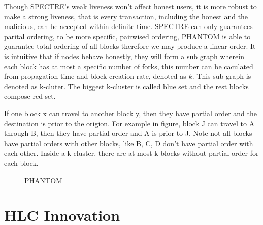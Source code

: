 \documentclass[a4paper,11pt]{article}
\begin{document}
Though SPECTRE's weak liveness won't affect honest users, it is more robust to make a strong liveness, that is every transaction, including the honest and the malicious, can be accepted within definite time. SPECTRE can only guarantees parital ordering, to be more specific, pairwised ordering, PHANTOM is able to guarantee total ordering of all blocks therefore we may produce a linear order. It is intuitive that if nodes behave honestly, they will form a sub graph wherein each block has at most a specific number of forks, this number can be caculated from propagation time and block creation rate, denoted as $k$. This sub graph is denoted as k-cluter. The biggest k-cluster is called blue set and the rest blocks compose red set.

If one block x can travel to another block y, then they have partial order and the destination is prior to the origion. For example in figure, block J can travel to A through B, then they have partial order and A is prior to J. Note not all blocks have partial orders with other blocks, like B, C, D don't have partial order with each other. Inside a k-cluster, there are at most k blocks without partial order for each block.

\begin{figure}[h]
	\centerline{%
	}
\caption{PHANTOM}
\end{figure}

\section{HLC Innovation}
\end{document}
